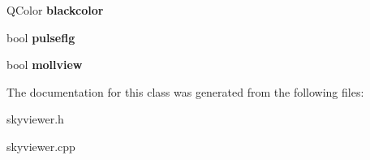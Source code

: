 \begin{DoxyCompactItemize}
\item 
\hypertarget{classSkyViewer_a55bd9e53a0f33e272c8fd9a37c272c6b}{
QColor {\bfseries blackcolor}}
\label{classSkyViewer_a55bd9e53a0f33e272c8fd9a37c272c6b}

\item 
\hypertarget{classSkyViewer_aca90f5fff74814a72776a0294ef78f38}{
bool {\bfseries pulseflg}}
\label{classSkyViewer_aca90f5fff74814a72776a0294ef78f38}

\item 
\hypertarget{classSkyViewer_ac97a5c1f3e73422ed28e8e3b21edb281}{
bool {\bfseries mollview}}
\label{classSkyViewer_ac97a5c1f3e73422ed28e8e3b21edb281}

\end{DoxyCompactItemize}


The documentation for this class was generated from the following files:\begin{DoxyCompactItemize}
\item 
skyviewer.h\item 
skyviewer.cpp\end{DoxyCompactItemize}
